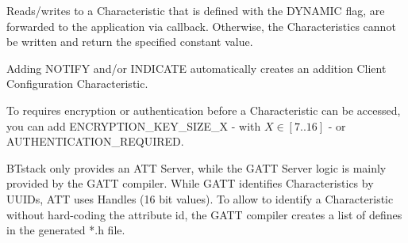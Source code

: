Reads/writes to a Characteristic that is defined with the DYNAMIC flag, are forwarded to the application via callback. Otherwise, the Characteristics cannot be written and return the specified constant value. 

Adding NOTIFY and/or INDICATE automatically creates an addition Client Configuration Characteristic.

To requires encryption or authentication before a Characteristic can be accessed, you can add ENCRYPTION\_KEY\_SIZE\_X - with $X \in [7..16]$ - or  AUTHENTICATION\_REQUIRED.

BTstack only provides an ATT Server, while the GATT Server logic is mainly provided by the GATT compiler. While GATT identifies Characteristics by UUIDs, ATT uses Handles (16 bit values). To allow to identify a Characteristic without hard-coding the attribute id, the GATT compiler creates a list of defines in the generated *.h file.






